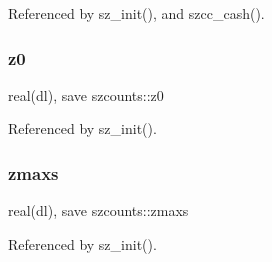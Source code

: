 Referenced by sz\+\_\+init(), and szcc\+\_\+cash().

\mbox{\label{namespaceszcounts_a2718f37c5199b68be9ce1a3298a1a64f}} 
\subsubsection{\texorpdfstring{z0}{z0}}
{\footnotesize\ttfamily real(dl), save szcounts\+::z0\hspace{0.3cm}{\ttfamily [private]}}



Referenced by sz\+\_\+init().

\mbox{\label{namespaceszcounts_ab3202a28ada73a28c4052802235a7f04}} 
\subsubsection{\texorpdfstring{zmaxs}{zmaxs}}
{\footnotesize\ttfamily real(dl), save szcounts\+::zmaxs\hspace{0.3cm}{\ttfamily [private]}}



Referenced by sz\+\_\+init().

